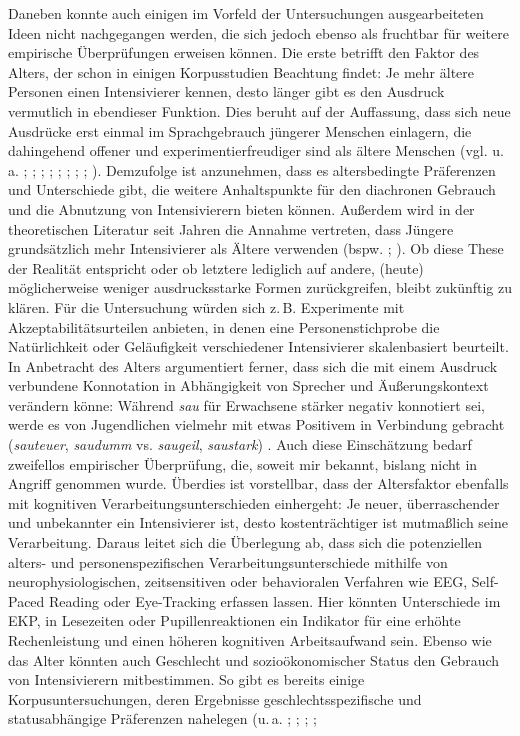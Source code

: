 Daneben konnte auch einigen im Vorfeld der Untersuchungen ausgearbeiteten Ideen nicht nachgegangen werden, die sich jedoch ebenso als fruchtbar für weitere empirische Überprüfungen erweisen können. Die erste betrifft den Faktor des Alters, der schon in einigen Korpusstudien Beachtung findet: Je mehr ältere Personen einen Intensivierer kennen, desto länger gibt es den Ausdruck vermutlich in ebendieser Funktion. Dies beruht auf der Auffassung, dass sich neue Ausdrücke erst einmal im Sprachgebrauch jüngerer Menschen einlagern, die dahingehend offener und experimentierfreudiger sind als ältere Menschen (vgl. u.\,a. \citealt[]{Androutsopoulos.1998,Androutsopoulos.1999}; \citealt[]{Paradis.2000a}; \citealt[]{Lorenz.2002}; \citealt[]{Kirschbaum.2002a}; \citealt[]{Tagliamonte.2008}; \citealt[]{Tagliamonte.2014a}; \citealt[]{Neuland.2018}; \citealt[]{Stratton.2020a}; \citealt[]{Tagliamonte.2020}). Demzufolge ist anzunehmen, dass es altersbedingte Präferenzen und Unterschiede gibt, die weitere Anhaltspunkte für den diachronen Gebrauch und die Abnutzung von Intensivierern bieten können. Außerdem wird in der theoretischen Literatur seit Jahren die Annahme vertreten, dass Jüngere grundsätzlich mehr Intensivierer als Ältere verwenden (bspw. \mbox{\citealt[]{Paradis.2000a}}; \mbox{\citealt[]{Ito.2003}}). Ob diese These der Realität entspricht oder ob letztere lediglich auf andere, (heute) möglicherweise weniger ausdrucksstarke Formen zurückgreifen, bleibt zukünftig zu klären. Für die Untersuchung würden sich z.\,B. Experimente mit Akzeptabilitätsurteilen anbieten, in denen eine Personenstichprobe die Natürlichkeit oder Geläufigkeit verschiedener Intensivierer skalenbasiert beurteilt. In Anbetracht des Alters argumentiert \mbox{\citet[229]{Pittner.1989}} ferner, dass sich die mit einem Ausdruck verbundene Konnotation in Abhängigkeit von Sprecher und Äußerungskontext verändern könne: Während \textit{sau} für Erwachsene stärker negativ konnotiert sei, werde es von Jugendlichen vielmehr mit etwas Positivem in Verbindung gebracht (\textit{sauteuer}, \textit{saudumm} vs. \textit{saugeil}, \textit{saustark}) \citep[vgl.][229]{Pittner.1989}. Auch diese Einschätzung bedarf zweifellos empirischer Überprüfung, die, soweit mir bekannt, bislang nicht in Angriff genommen wurde. Überdies ist vorstellbar, dass der Altersfaktor ebenfalls mit kognitiven Verarbeitungsunterschieden einhergeht: Je neuer, überraschender und unbekannter ein Intensivierer ist, desto kostenträchtiger ist mutmaßlich seine Verarbeitung. Daraus leitet sich die Überlegung ab, dass sich die potenziellen alters- und personenspezifischen Verarbeitungsunterschiede mithilfe von neurophysiologischen, zeitsensitiven oder behavioralen Verfahren wie EEG, Self-Paced Reading oder Eye-Tracking erfassen lassen. Hier könnten Unterschiede im EKP, in Lesezeiten oder Pupillenreaktionen ein Indikator für eine erhöhte Rechenleistung und einen höheren kognitiven Arbeitsaufwand sein. Ebenso wie das Alter könnten auch Geschlecht und sozioökonomischer Status den Gebrauch von Intensivierern mitbestimmen. So gibt es bereits einige Korpusuntersuchungen, deren Ergebnisse geschlechtsspezifische und statusabhängige Präferenzen nahelegen (u.\,a. \citealt[]{Macaulay.1995}; \citealt[]{Ito.2003}; \citealt[]{Tagliamonte.2005}; \citealt[]{Tagliamonte.2008}; 